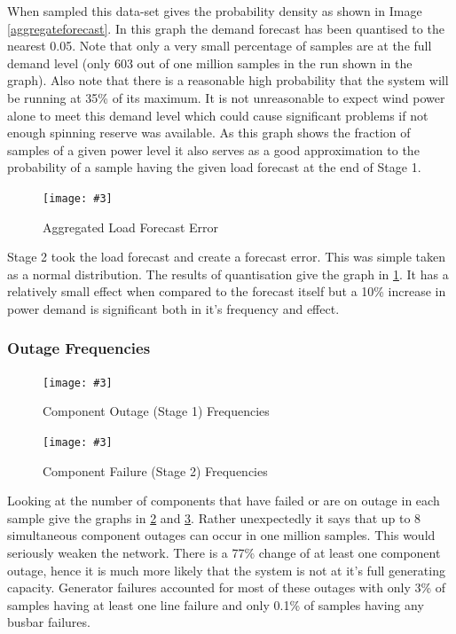 \documentclass[a4paper,oneside,12pt]{report}
\newcommand{\image}[3] {
  \begin{figure}
    \begin{center}
      \texttt{[image: \#3]}
      \caption{#2}
      \label{#1}
    \end{center}
  \end{figure}
}
\begin{document}
When sampled this data-set gives the probability density as shown in Image \ref{aggregateforecast}. In this graph the demand forecast has been quantised to the nearest 0.05. Note that only a very small percentage of samples are at the full demand level (only 603 out of one million samples in the run shown in the graph). Also note that there is a reasonable high probability that the system will be running at 35\% of its maximum. It is not unreasonable to expect wind power alone to meet this demand level which could cause significant problems if not enough spinning reserve was available. As this graph shows the fraction of samples of a given power level it also serves as a good approximation to the probability of a sample having the given load forecast at the end of Stage 1.

\image{aggregateforecasterror}{Aggregated Load Forecast Error}{aggregateforecasterror.png}

Stage 2 took the load forecast and create a forecast error. This was simple taken as a normal distribution. The results of quantisation give the graph in \ref{aggregateforecasterror}. It has a relatively small effect when compared to the forecast itself but a 10\% increase in power demand is significant both in it's frequency and effect.

\subsubsection{Outage Frequencies}

\image{outagefrequencies}{Component Outage (Stage 1) Frequencies}{outagefrequencies.png}

\image{failurefrequencies}{Component Failure (Stage 2) Frequencies}{failurefrequencies.png}

Looking at the number of components that have failed or are on outage in each sample give the graphs in \ref{outagefrequencies} and \ref{failurefrequencies}. Rather unexpectedly it says that up to 8 simultaneous component outages can occur in one million samples. This would seriously weaken the network. There is a 77\% change of at least one component outage, hence it is much more likely that the system is not at it's full generating capacity. Generator failures accounted for most of these outages with only 3\% of samples having at least one line failure and only 0.1\% of samples having any busbar failures.
\end{document}
